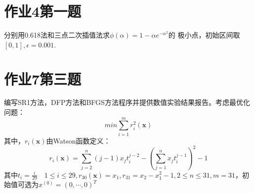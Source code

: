 

    

    \maketitle
    \newpage

    \tableofcontents

    \newpage
    \section{作业4第一题}
    分别用0.618法和三点二次插值法求$ \phi(\alpha) = 1-\alpha e^{-\alpha^2}  $的
    极小点，初始区间取$ [0,1] ,\epsilon = 0.001$.

    \section{作业7第三题}
    编写SR1方法，DFP方法和BFGS方法程序并提供数值实验结果报告。考虑最优化问题：
    \[
        min\sum \limits_{i=1}^m r_i^2(\bm{x}) 
    \] 
    其中，$ r_i(\bm{x}) $由Watson函数定义：
    \[
        r_i(\bm{x}) = \sum \limits_{j=2}^n(j-1)x_jt_i^{j-2}-(\sum\limits_{j=1}^n 
        x_jt_i^{j-1} )^2-1  
    \]  
    其中$ t_i = \frac{i}{29} \quad 1\leq i\leq 29, r_{30}(\bm{x}) = x_1, r_{31} = x_2-x_1^2-1, 2\leq n
    \leq 31,m =31 $，初始值可选为$ x^{(0)} = (0,\cdots,0)^T  $  
    \renewcommand{\refname}{参考文献}
    
    
